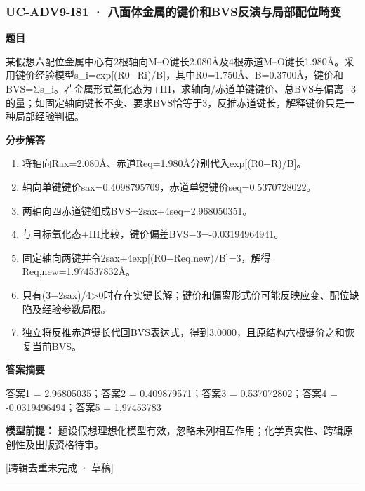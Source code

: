 \documentclass[UTF8,11pt,a4paper]{ctexart}
\begin{document}
\subsubsection*{UC-ADV9-I81 · 八面体金属的键价和BVS反演与局部配位畸变}
\noindent\textbf{题目}\par
某假想六配位金属中心有2根轴向M–O键长2.080Å及4根赤道M–O键长1.980Å。采用键价经验模型s\_i=exp[(R0−Ri)/B]，其中R0=1.750Å、B=0.3700Å，键价和BVS=Σs\_i。若金属形式氧化态为+III，求轴向/赤道单键键价、总BVS与偏离+3的量；如固定轴向键长不变、要求BVS恰等于3，反推赤道键长，解释键价只是一种局部经验判据。\par
\medskip\noindent\textbf{分步解答}
\begin{enumerate}
\item 将轴向Rax=2.080Å、赤道Req=1.980Å分别代入exp[(R0−R)/B]。
\item 轴向单键键价sax=0.4098795709，赤道单键键价seq=0.5370728022。
\item 两轴向四赤道键组成BVS=2sax+4seq=2.968050351。
\item 与目标氧化态+III比较，键价偏差BVS−3=-0.03194964941。
\item 固定轴向两键并令2sax+4exp[(R0−Req,new)/B]=3，解得Req,new=1.974537832Å。
\item 只有(3−2sax)/4>0时存在实键长解；键价和偏离形式价可能反映应变、配位缺陷及经验参数局限。
\item 独立将反推赤道键长代回BVS表达式，得到3.0000，且原结构六根键价之和恢复当前BVS。
\end{enumerate}
\noindent\textbf{答案摘要}\par
答案1 = 2.96805035；答案2 = 0.409879571；答案3 = 0.537072802；答案4 = -0.0319496494；答案5 = 1.97453783\par
\noindent\textbf{模型前提：}
题设假想理想化模型有效，忽略未列相互作用；化学真实性、跨辑原创性及出版资格待审。\par
\noindent\textcolor{red!65!black}{[跨辑去重未完成 · 草稿]} \par
\medskip\hrule\medskip
{}
\end{document}
